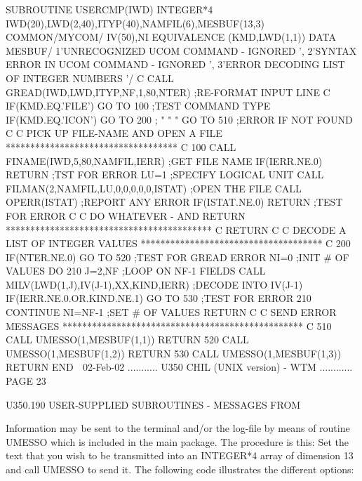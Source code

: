          SUBROUTINE USERCMP(IWD)
         INTEGER*4 IWD(20),LWD(2,40),ITYP(40),NAMFIL(6),MESBUF(13,3)
         COMMON/MYCOM/ IV(50),NI
         EQUIVALENCE (KMD,LWD(1,1))
         DATA MESBUF/
        1'UNRECOGNIZED UCOM COMMAND - IGNORED                 ',
        2'SYNTAX ERROR IN UCOM COMMAND - IGNORED              ',
        3'ERROR DECODING LIST OF INTEGER NUMBERS              '/
   C
         CALL GREAD(IWD,LWD,ITYP,NF,1,80,NTER)    ;RE-FORMAT INPUT LINE
   C
         IF(KMD.EQ.'FILE') GO TO 100              ;TEST COMMAND TYPE
         IF(KMD.EQ.'ICON') GO TO 200              ;  "     "     "
         GO TO 510                                ;ERROR IF NOT FOUND
   C
   C     PICK UP FILE-NAME AND OPEN A FILE ***********************************
   C
     100 CALL FINAME(IWD,5,80,NAMFIL,IERR)        ;GET FILE NAME
         IF(IERR.NE.0) RETURN                     ;TST FOR ERROR
         LU=1                                     ;SPECIFY LOGICAL UNIT
         CALL FILMAN(2,NAMFIL,LU,0,0,0,0,0,ISTAT) ;OPEN THE FILE
         CALL OPERR(ISTAT)                        ;REPORT ANY ERROR
         IF(ISTAT.NE.0) RETURN                    ;TEST FOR ERROR
   C
   C     DO WHATEVER  -  AND RETURN ******************************************
   C
         RETURN
   C
   C     DECODE A LIST OF INTEGER VALUES *************************************
   C
     200 IF(NTER.NE.0) GO TO 520                  ;TEST FOR GREAD ERROR
         NI=0                                     ;INIT # OF VALUES
         DO 210 J=2,NF                            ;LOOP ON NF-1 FIELDS
         CALL MILV(LWD(1,J),IV(J-1),XX,KIND,IERR) ;DECODE INTO IV(J-1)
         IF(IERR.NE.0.OR.KIND.NE.1) GO TO 530     ;TEST FOR ERROR
     210 CONTINUE
         NI=NF-1                                  ;SET # OF VALUES
         RETURN
   C
   C     SEND ERROR MESSAGES *************************************************
   C
     510 CALL UMESSO(1,MESBUF(1,1))
         RETURN
     520 CALL UMESSO(1,MESBUF(1,2))
         RETURN
     530 CALL UMESSO(1,MESBUF(1,3))
         RETURN
         END
    
   02-Feb-02 ........... U350  CHIL (UNIX version) - WTM ............ PAGE  23
 
 
 
   U350.190  USER-SUPPLIED SUBROUTINES - MESSAGES FROM
 
   Information may be sent to the terminal and/or the  log-file  by  means  of
   routine  UMESSO  which  is  included  in the main package. The procedure is
   this: Set the text that you wish to be transmitted into an INTEGER*4  array
   of  dimension 13 and call UMESSO to send it. The following code illustrates
   the different options:
 
